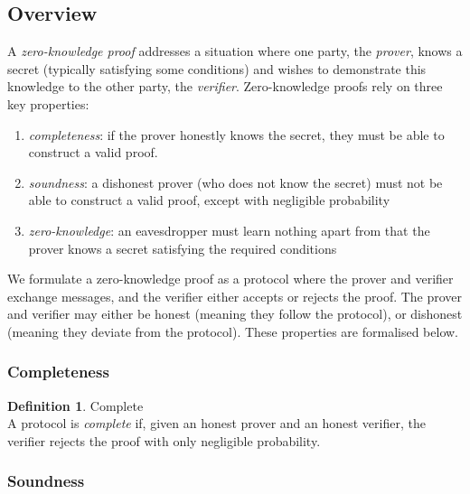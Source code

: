 \documentclass[11pt,twoside,a4paper]{article}
\theoremstyle{definition}
\newtheorem{definition}{Definition}[section]
\begin{document}
\subsection{Overview}
A \textit{zero-knowledge proof} addresses a situation where one party, the \textit{prover}, knows a secret (typically satisfying some conditions) and wishes to demonstrate this knowledge to the other party, the \textit{verifier}. Zero-knowledge proofs rely on three key properties:
\begin{enumerate}
    \item \textit{completeness}: if the prover honestly knows the secret, they must be able to construct a valid proof.
    \item \textit{soundness}: a dishonest prover (who does not know the secret) must not be able to construct a valid proof, except with negligible probability
    \item \textit{zero-knowledge}: an eavesdropper must learn nothing apart from that the prover knows a secret satisfying the required conditions
\end{enumerate}
We formulate a zero-knowledge proof as a protocol where the prover and verifier exchange messages, and the verifier either accepts or rejects the proof. The prover and verifier may either be honest (meaning they follow the protocol), or dishonest (meaning they deviate from the protocol). These properties are formalised below.
\subsubsection{Completeness}
\begin{definition}{Complete}\\
    A protocol is \textit{complete} if, given an honest prover and an honest verifier, the verifier rejects the proof with only negligible probability.
\end{definition}
\subsubsection{Soundness}
\end{document}
